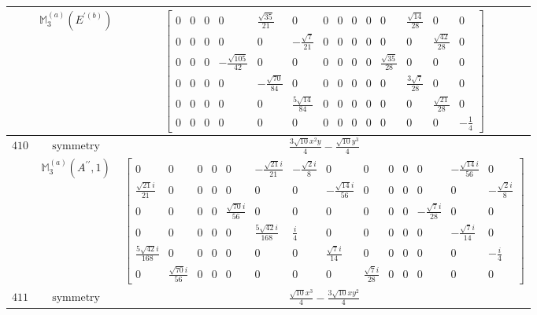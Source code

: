\documentclass[fleqn,8pt,landscape]{jsarticle}
\begin{document}
\begin{longtable}{ccc}
$  $ & $ \mathbb{M}_{3}^{(a)}(E^{\prime(b)}) $ & $ \begin{bmatrix} 0 & 0 & 0 & 0 & \frac{\sqrt{35}}{21} & 0 & 0 & 0 & 0 & 0 & 0 & \frac{\sqrt{14}}{28} & 0 & 0 \\ 0 & 0 & 0 & 0 & 0 & - \frac{\sqrt{7}}{21} & 0 & 0 & 0 & 0 & 0 & 0 & \frac{\sqrt{42}}{28} & 0 \\ 0 & 0 & 0 & - \frac{\sqrt{105}}{42} & 0 & 0 & 0 & 0 & 0 & 0 & \frac{\sqrt{35}}{28} & 0 & 0 & 0 \\ 0 & 0 & 0 & 0 & - \frac{\sqrt{70}}{84} & 0 & 0 & 0 & 0 & 0 & 0 & \frac{3 \sqrt{7}}{28} & 0 & 0 \\ 0 & 0 & 0 & 0 & 0 & \frac{5 \sqrt{14}}{84} & 0 & 0 & 0 & 0 & 0 & 0 & \frac{\sqrt{21}}{28} & 0 \\ 0 & 0 & 0 & 0 & 0 & 0 & 0 & 0 & 0 & 0 & 0 & 0 & 0 & - \frac{1}{4} \end{bmatrix} $ \\ \hline
$ 410 $ & $ \text{symmetry} $ & $ \frac{3 \sqrt{10} x^{2} y}{4} - \frac{\sqrt{10} y^{3}}{4} $ \\
$  $ & $ \mathbb{M}_{3}^{(a)}(A^{\prime\prime},1) $ & $ \begin{bmatrix} 0 & 0 & 0 & 0 & 0 & - \frac{\sqrt{21} i}{21} & - \frac{\sqrt{2} i}{8} & 0 & 0 & 0 & 0 & 0 & - \frac{\sqrt{14} i}{56} & 0 \\ \frac{\sqrt{21} i}{21} & 0 & 0 & 0 & 0 & 0 & 0 & - \frac{\sqrt{14} i}{56} & 0 & 0 & 0 & 0 & 0 & - \frac{\sqrt{2} i}{8} \\ 0 & 0 & 0 & 0 & \frac{\sqrt{70} i}{56} & 0 & 0 & 0 & 0 & 0 & 0 & - \frac{\sqrt{7} i}{28} & 0 & 0 \\ 0 & 0 & 0 & 0 & 0 & \frac{5 \sqrt{42} i}{168} & \frac{i}{4} & 0 & 0 & 0 & 0 & 0 & - \frac{\sqrt{7} i}{14} & 0 \\ \frac{5 \sqrt{42} i}{168} & 0 & 0 & 0 & 0 & 0 & 0 & \frac{\sqrt{7} i}{14} & 0 & 0 & 0 & 0 & 0 & - \frac{i}{4} \\ 0 & \frac{\sqrt{70} i}{56} & 0 & 0 & 0 & 0 & 0 & 0 & \frac{\sqrt{7} i}{28} & 0 & 0 & 0 & 0 & 0 \end{bmatrix} $ \\ \hline
$ 411 $ & $ \text{symmetry} $ & $ \frac{\sqrt{10} x^{3}}{4} - \frac{3 \sqrt{10} x y^{2}}{4} $ \\

\end{longtable}
\end{document}

